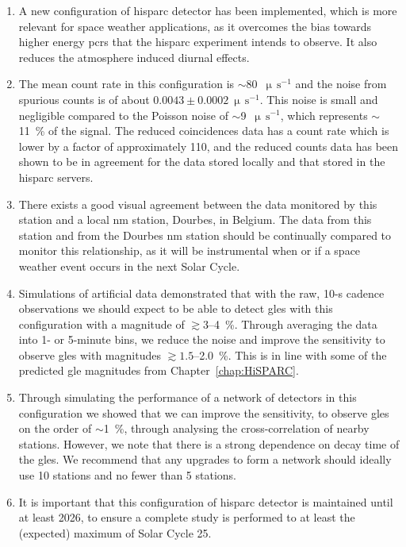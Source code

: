 \begin{enumerate}
	\item{A new configuration of \gls{hisparc} detector has been implemented, which is more relevant for space weather applications, as it overcomes the bias towards higher energy \glspl{pcr} that the \gls{hisparc} experiment intends to observe. It also reduces the atmosphere induced diurnal effects.}%

	\item{The mean count rate in this configuration is $\sim$80~$\upmu \, \mathrm{s}^{-1}$ and the noise from spurious counts is of about $0.0043\pm0.0002~\upmu \, \mathrm{s}^{-1}$. This noise is small and negligible compared to the Poisson noise of $\sim$9~$\upmu \, \mathrm{s}^{-1}$, which represents $\sim$11~\% of the signal. The reduced coincidences data has a count rate which is lower by a factor of approximately 110, and the reduced counts data has been shown to be in agreement for the data stored locally and that stored in the \gls{hisparc} servers.}
	
	\item{There exists a good visual agreement between the data monitored by this station and a local \gls{nm} station, Dourbes, in Belgium. The data from this station and from the Dourbes \gls{nm} station should be continually compared to monitor this relationship, as it will be instrumental when or if a space weather event occurs in the next Solar Cycle.}
	
	\item{Simulations of artificial data demonstrated that with the raw, 10-s cadence observations we should expect to be able to detect \glspl{gle} with this configuration with a magnitude of $\gtrsim3$--4~\%. Through averaging the data into 1- or 5-minute bins, we reduce the noise and improve the sensitivity to observe \glspl{gle} with magnitudes $\gtrsim1.5$--2.0~\%. This is in line with some of the predicted \gls{gle} magnitudes from Chapter~\ref{chap:HiSPARC}.}
	
	\item{Through simulating the performance of a network of detectors in this configuration we showed that we can improve the sensitivity, to observe \glspl{gle} on the order of $\sim$1~\%, through analysing the cross-correlation of nearby stations. However, we note that there is a strong dependence on decay time of the \glspl{gle}. We recommend that any upgrades to form a network should ideally use 10 stations and no fewer than 5 stations.}
	
	\item{It is important that this configuration of \gls{hisparc} detector is maintained until at least 2026, to ensure a complete study is performed to at least the (expected) maximum of Solar Cycle 25.}
\end{enumerate}